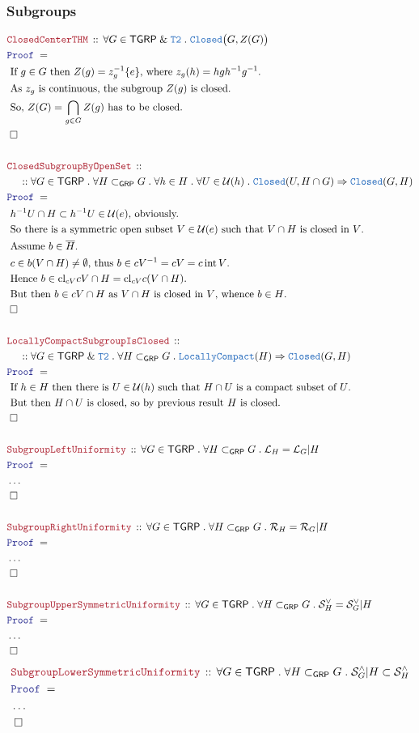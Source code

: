 \documentclass[12pt]{scrartcl}
\newcommand{\TYPE}[1]{\textcolor{NavyBlue}{\mathtt{#1}}}
\newcommand{\LOGIC}[1]{\textcolor{Blue}{\mathtt{#1}}}
\newcommand{\THM}[1]{\textcolor{Maroon}{\mathtt{#1}}}
\renewcommand{\.}{\; . \;}
\newcommand{\Theorem}[2]{& \THM{#1} \, :: \, #2 \\ & \Proof = \\ }
\newcommand{\NewLine}{\\ & \kern 1pc}
\newcommand{\Page}[1]{ \begin{align*} #1 \end{align*}   }
\newcommand{\NoProof}{ & \ldots \\ \EndProof}
\newcommand{\Explain}[1]{& \text{#1.} \\}
\renewcommand{\And}{\; \& \;}
\newcommand{\Imply}{\Rightarrow}
\newcommand{\QED}{\; \square}
\newcommand{\EndProof}{& \QED \\}
\newcommand{\Proof}{\LOGIC{Proof} \; }
\newcommand{\R}{\mathrm{R}}
\newcommand{\Closed}{\TYPE{Closed}}
\newcommand{\LC}{\TYPE{LocallyCompact}}
\DeclareMathOperator*{\intx}{int}
\DeclareMathOperator*{\cl}{cl}
\renewcommand{\U}{\mathcal{U}}
\renewcommand{\L}{\mathcal{L}}
\renewcommand{\S}{\mathcal{S}}
\newcommand{\GRP}{\mathsf{GRP}}
\newcommand{\TGRP}{\mathsf{TGRP}}
\renewcommand{\L}{\mathcal{L}}
\renewcommand{\R}{\mathcal{R}}
\renewcommand{\S}{\mathcal{S}}
\begin{document}
\subsubsection{Subgroups}
\Page{
	\Theorem{ClosedCenterTHM}
	{
		\forall G \in \TGRP \And \TYPE{T2} \.
		\Closed\big( G, Z(G) \big)     
	}
	\Explain{
		If $g \in G$ then $Z(g) = z^{-1}_g\{e\}$, where $z_g(h) = hgh^{-1}g^{-1}$}
	\Explain{
		As $z_g$ is continuous, the subgroup $Z(g)$ is closed}
	\Explain{
		So, $Z(G) = \bigcap_{g \in G} Z(g)$ has to be closed}
	\EndProof
	\\
	\Theorem{ClosedSubgroupByOpenSet}
	{
		\NewLine ::		
		\forall G \in \TGRP \.
		\forall H \subset_\GRP G \.
		\forall h \in H \.
		\forall U \in \U(h) \.
		\Closed(U,H \cap G) \Imply \Closed(G,H)
	}
	\Explain{   
		$h^{-1}U \cap H \subset h^{-1}U \in \U(e)$, obviously}
	\Explain{
		So there is a symmetric open subset $V \in \U(e)$ such that
		$V \cap H$ is closed in $V$}
	\Explain{
		Assume $b \in \overline{H}$}
	\Explain{
		$c \in b(V \cap H) \neq \emptyset$, thus 
		$b \in cV^{-1} = cV = c \intx V$}
	\Explain{
		Hence $b \in {\cl}_{cV} cV \cap H = {\cl}_{cV} c(V \cap H)$}
	\Explain{
		But then $b \in cV \cap H$ as $V \cap H$ is closed in $V$, whence $b \in H$}
	\EndProof
	\\
	\Theorem{LocallyCompactSubgroupIsClosed}
	{
		\NewLine ::
		\forall G \in \TGRP \And \TYPE{T2} \.
		\forall H \subset_\GRP G \.
		\LC(H) \Imply \Closed(G,H)
	}
	\Explain{
		If $h \in H$ then there is $U \in \U(h)$ such that 
		$H \cap U$ is a compact subset of $U$}
	\Explain{
			But then $H \cap U$ is closed, 
			so by previous result  $H$ is closed}
	\EndProof
	\\
	\Theorem{SubgroupLeftUniformity}
	{
		\forall G \in \TGRP \.
		\forall H \subset_\GRP G \. 
		\L_H = \L_G | H
	}
	\NoProof	
	\\
	\Theorem{SubgroupRightUniformity}
	{
		\forall G \in \TGRP \.
		\forall H \subset_\GRP G \. 
		\R_H = \R_G | H
	}
	\NoProof	
	\\	
	\Theorem{SubgroupUpperSymmetricUniformity}
	{
		\forall G \in \TGRP \.
		\forall H \subset_\GRP G \. 
		\S_H^\vee = \S_G^\vee | H
	}
	\NoProof	
}\Page{
	\Theorem{SubgroupLowerSymmetricUniformity}
	{
		\forall G \in \TGRP \.
		\forall H \subset_\GRP G \. 
		 \S_G^\wedge | H \subset \S_H^\wedge
	}
	\NoProof	
}
\newpage
\end{document}
